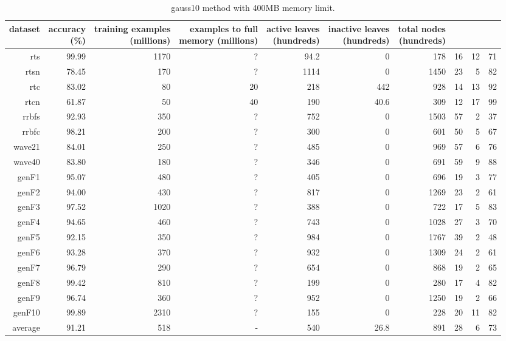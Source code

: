 \clearpage
\begin{table}
\caption{{\sc gauss10} method with 400MB memory limit.}
\label{tab:gauss10-400MB}
\centering
\begin{tabular}{|r|r|r|r|r|r|r|r|r|r|}
\hline
dataset	&
\rotatebox{90}{\parbox{9em}{accuracy\\(\%)}} &
\rotatebox{90}{\parbox{9em}{training examples\\(millions)}} &
\rotatebox{90}{\parbox{9em}{examples to full\\memory (millions)}} &
\rotatebox{90}{\parbox{9em}{active leaves\\(hundreds)}} &
\rotatebox{90}{\parbox{9em}{inactive leaves\\(hundreds)}} &
\rotatebox{90}{\parbox{9em}{total nodes\\(hundreds)}} &
\rotatebox{90}{\parbox{9em}{tree depth}}	&
\rotatebox{90}{\parbox{9em}{training speed (\%)}} &
\rotatebox{90}{\parbox{9em}{prediction speed (\%)}} \\
\hline
{\sc rts} & 99.99 & 1170 & ? & 94.2 & 0 & 178 & 16 & 12 & 71 \\
{\sc rtsn} & 78.45 & 170 & ? & 1114 & 0 & 1450 & 23 & 5 & 82 \\
{\sc rtc} & 83.02 & 80 & 20 & 218 & 442 & 928 & 14 & 13 & 92 \\
{\sc rtcn} & 61.87 & 50 & 40 & 190 & 40.6 & 309 & 12 & 17 & 99 \\
{\sc rrbfs} & 92.93 & 350 & ? & 752 & 0 & 1503 & 57 & 2 & 37 \\
{\sc rrbfc} & 98.21 & 200 & ? & 300 & 0 & 601 & 50 & 5 & 67 \\
{\sc wave21} & 84.01 & 250 & ? & 485 & 0 & 969 & 57 & 6 & 76 \\
{\sc wave40} & 83.80 & 180 & ? & 346 & 0 & 691 & 59 & 9 & 88 \\
{\sc genF1} & 95.07 & 480 & ? & 405 & 0 & 696 & 19 & 3 & 77 \\
{\sc genF2} & 94.00 & 430 & ? & 817 & 0 & 1269 & 23 & 2 & 61 \\
{\sc genF3} & 97.52 & 1020 & ? & 388 & 0 & 722 & 17 & 5 & 83 \\
{\sc genF4} & 94.65 & 460 & ? & 743 & 0 & 1028 & 27 & 3 & 70 \\
{\sc genF5} & 92.15 & 350 & ? & 984 & 0 & 1767 & 39 & 2 & 48 \\
{\sc genF6} & 93.28 & 370 & ? & 932 & 0 & 1309 & 24 & 2 & 61 \\
{\sc genF7} & 96.79 & 290 & ? & 654 & 0 & 868 & 19 & 2 & 65 \\
{\sc genF8} & 99.42 & 810 & ? & 199 & 0 & 280 & 17 & 4 & 82 \\
{\sc genF9} & 96.74 & 360 & ? & 952 & 0 & 1250 & 19 & 2 & 66 \\
{\sc genF10} & 99.89 & 2310 & ? & 155 & 0 & 228 & 20 & 11 & 82 \\
\hline
average & 91.21 & 518 &  -  & 540 & 26.8 & 891 & 28 & 6 & 73 \\
\hline
\end{tabular}
\end{table}
